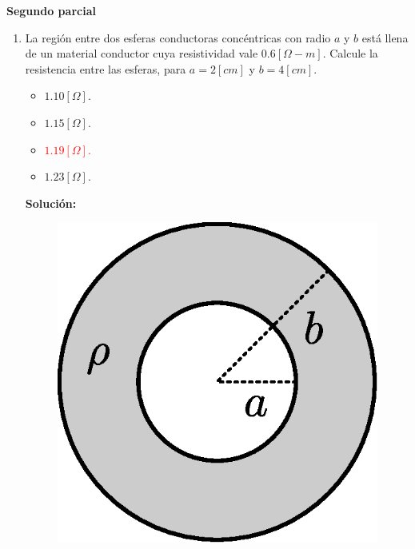 \documentclass[letter,11pt]{article}
\begin{document}
\begin{center}
    {\Large \bf{Segundo parcial}}
\end{center}

\noindent{}

\vspace{0.5cm}

\begin{enumerate}
\item La región entre dos esferas conductoras concéntricas con radio $a$ y $b$
está llena de un material conductor cuya resistividad vale $0.6 [\Omega-m]$.
Calcule la resistencia entre las esferas, para $a = 2[cm]$ y $b = 4[cm]$.

\begin{itemize}
    \item $1.10 [\Omega]$.
    \item $1.15 [\Omega]$.
    \item \textcolor{red}{$ 1.19 [\Omega]$.}
    \item $1.23 [\Omega]$.
\end{itemize}

\textbf{Solución:}

\begin{figure}[!h]
\centering
\includegraphics[scale=0.40]{resources/a1.eps}
\end{figure}


\end{enumerate}
\end{document}
